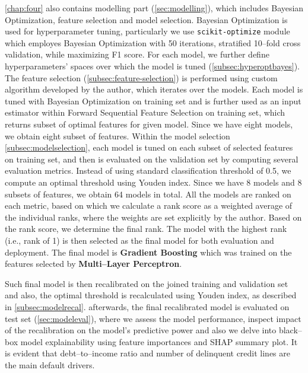 \autoref{chap:four} also contains modelling part (\autoref{sec:modelling}), which includes Bayesian Optimization, feature selection and model selection.
Bayesian Optimization is used for hyperparameter tuning, particularly we use \lstinline{scikit-optimize} module which employes Bayesian Optimization with 50 iterations, stratified 10--fold cross validation, while maximizing F1 score. For each model, we further define hyperparameters' spaces over which the model is tuned (\autoref{subsec:hyperoptbayes}).
The feature selection (\autoref{subsec:feature-selection}) is performed using custom algorithm developed by the author, which iterates over the models. Each model is tuned with Bayesian Optimization on training set and is further used as an input estimator within Forward Sequential Feature Selection on training set, which returns subset of optimal features for given model. Since we have eight models, we obtain eight subset of features.
Within the model selection \autoref{subsec:modelselection}, each model is tuned on each subset of selected features on training set, and then is evaluated on the validation set by computing several evaluation metrics.
Instead of using standard classification threshold of 0.5, we compute an optimal threshold using Youden index. Since we have 8 models and 8 subsets of features, we obtain 64 models in total.
All the models are ranked on each metric, based on which we calculate a rank score as a weighted average of the individual ranks, where the weights are set explicitly by the author. Based on the rank score, we determine the final rank. The model with the highest rank (i.e., rank of 1) is then selected as the final model for both evaluation and deployment.
The final model is \textbf{Gradient Boosting} which was trained on the features selected by \textbf{Multi--Layer Perceptron}.

Such final model is then recalibrated on the joined training and validation set and also, the optimal threshold is recalculated using Youden index, as described in \autoref{subsec:modelrecal}.
afterwards, the final recalibrated model is evaluated on test set (\autoref{sec:modeleval}), where we assess the model performance, inspect impact of the recalibration on the model's predictive power and also we delve into black--box model explainability using feature importances and SHAP summary plot. It is evident that debt--to--income ratio and number of delinquent credit lines are the main default drivers.

